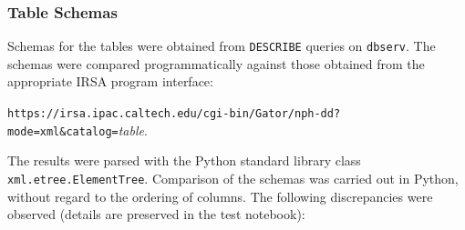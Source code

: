 \documentclass[DM,lsstdraft,STR,toc]{lsstdoc}
\begin{document}
\subsubsection{Table Schemas}
\label{sect:lsp-00-00-api-schema}

Schemas for the tables were obtained from \verb|DESCRIBE| queries on \verb|dbserv|.
The schemas were compared programmatically against those obtained from the 
appropriate IRSA program interface:

\begin{center}
\verb|https://irsa.ipac.caltech.edu/cgi-bin/Gator/nph-dd?mode=xml&catalog=|\textit{table}.
\end{center}

The results were parsed with the Python standard library class \verb|xml.etree.ElementTree|.
Comparison of the schemas was carried out in Python, without regard to the ordering of columns.
The following discrepancies were observed (details are preserved in the test notebook):
\end{document}
